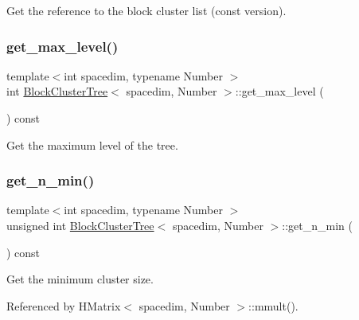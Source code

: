 Get the reference to the block cluster list (const version). \mbox{\label{classBlockClusterTree_a404693ef7dfdbc383705c38105c75e14}} 
\subsubsection{\texorpdfstring{get\+\_\+max\+\_\+level()}{get\_max\_level()}}
{\footnotesize\ttfamily template$<$int spacedim, typename Number $>$ \\
int \hyperlink{classBlockClusterTree}{Block\+Cluster\+Tree}$<$ spacedim, Number $>$\+::get\+\_\+max\+\_\+level (\begin{DoxyParamCaption}{ }\end{DoxyParamCaption}) const}

Get the maximum level of the tree. \mbox{\label{classBlockClusterTree_ab00acda5e8fd4c3e381637d8d9322923}} 
\subsubsection{\texorpdfstring{get\+\_\+n\+\_\+min()}{get\_n\_min()}}
{\footnotesize\ttfamily template$<$int spacedim, typename Number $>$ \\
unsigned int \hyperlink{classBlockClusterTree}{Block\+Cluster\+Tree}$<$ spacedim, Number $>$\+::get\+\_\+n\+\_\+min (\begin{DoxyParamCaption}{ }\end{DoxyParamCaption}) const}

Get the minimum cluster size. 

Referenced by H\+Matrix$<$ spacedim, Number $>$\+::mmult().

\mbox{\label{classBlockClusterTree_a82f61b31f1e9cf869831fa4c8232df81}} 
